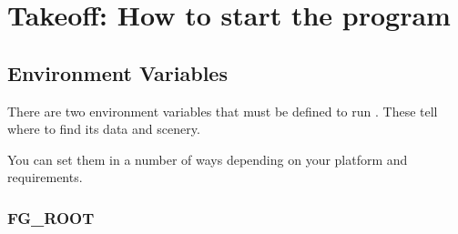 
\chapter{Takeoff: How to start the program}
\label{takeoff}


\section{Environment Variables}

There are two environment variables that must be defined to run \FlightGear{}.
These tell \FlightGear{} where to find its data and scenery.

You can set them in a number of ways depending on your platform and requirements. 

\subsection{FG\_ROOT}

